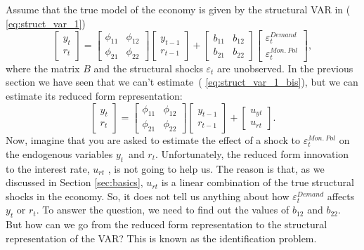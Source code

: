 \documentclass[10pt]{article}
\begin{document}
Assume that the true model of the economy is given by the structural VAR in (%
\ref{eq:struct_var_1})%
\begin{equation}
\left[
\begin{array}{c}
y_{t} \\
r_{t}%
\end{array}%
\right] =%
\begin{bmatrix}
\phi _{11} & \phi _{12} \\
\phi _{21} & \phi _{22}%
\end{bmatrix}%
\left[
\begin{array}{c}
y_{t-1} \\
r_{t-1}%
\end{array}%
\right] +\left[
\begin{array}{cc}
b_{11} & b_{12} \\
b_{21} & b_{22}%
\end{array}%
\right]
\begin{bmatrix}
\varepsilon _{t}^{Demand} \\
\varepsilon _{t}^{Mon.\ Pol}%
\end{bmatrix}%
,  \label{eq:struct_var_3}
\end{equation}%
where the matrix $B$ and the structural shocks $\varepsilon _{t}$ are
unobserved. In the previous section we have seen that we can't estimate\ (%
\ref{eq:struct_var_1_bis}), but we can estimate its reduced form
representation:%
\begin{equation}
\left[
\begin{array}{c}
y_{t} \\
r_{t}%
\end{array}%
\right] =%
\begin{bmatrix}
\phi _{11} & \phi _{12} \\
\phi _{21} & \phi _{22}%
\end{bmatrix}%
\left[
\begin{array}{c}
y_{t-1} \\
r_{t-1}%
\end{array}%
\right] +\left[
\begin{array}{c}
u_{yt} \\
u_{rt}%
\end{array}%
\right] .  \label{eq:red_var_3}
\end{equation}%
Now, imagine that you are asked to estimate the effect of a shock to $%
\varepsilon _{t}^{Mon.\ Pol}$ on the endogenous variables $y_{t}$\ and $r_{t}
$. Unfortunately, the reduced form innovation to the interest rate, $u_{rt}$%
, is not going to help us. The reason is that, as we discussed in Section %
\ref{sec:basics}, $u_{rt}$ is a linear combination of the true structural
shocks in the economy. So, it does not tell us anything about how $%
\varepsilon _{t}^{Demand}$ affects $y_{t}$ or $r_{t}$. To answer the
question, we need to find out the values of $b_{12}$ and $b_{22}$. But how
can we go from the reduced form representation to the structural
representation of the VAR? This is known as the identification problem.
\end{document}
